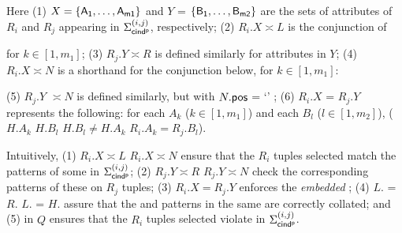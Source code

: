 \noindent Here (1) $X = \{\protect\mathsf{A_1,\dots, A_{m1}}\}$ and $Y$ =
$\{\protect\mathsf{B_1,\dots, B_{m2}}\}$ are the sets of attributes of $R_i$ and
 $R_j$ appearing in $\Sigma_{{\mathsf{cind^p}}}^{(i,j)}$, respectively;
(2) $R_i.X\asymp L$ is the conjunction of

\vspace{-1.5ex} \begin{footnotesize}\vspace{-1.5ex}
\end{footnotesize}

\noindent
for $k\in[1, m_1]$;
(3) $R_j.Y\asymp R$ is defined similarly for attributes
 in $Y$;
(4) $R_i.X\asymp N$ is a shorthand for the conjunction below,
for $k\in[1, m_1]$:

\vspace{-1.5ex} \begin{footnotesize}\vspace{-1.5ex}
\end{footnotesize}

\noindent
(5) $R_j.Y$ $\asymp N$ is defined similarly,
but with $N.\protect\mathsf{pos}$ = `\RHS' ; (6) $R_i.X$
  = $R_j.Y$ represents the following:
for each $A_k$  ($k\in[1, m_1]$) and each $B_l$ ($l\in[1, m_2]$),
($H.A_k$ 
 $H.B_l$   $H.B_l \ne H.A_k$   $R_i.A_k
= R_j.B_l$).



Intuitively, (1) $R_i.X\asymp L$  $R_i.X\asymp N$ ensure
that the $R_i$ tuples selected match the \LHS patterns of some
\pCINDs in  $\Sigma_{{\mathsf{cind^p}}}^{(i,j)}$;
(2) $R_j.Y\asymp R$  $R_j.Y\asymp N$ check the corresponding
 \RHS patterns of these \pCINDs on
$R_j$ tuples;
(3) $R_i.X = R_j.Y$ enforces the
{\em embedded} \INDs; (4) $L$. = $R$.
 $L$. = $H$. assure that the \LHS and
\RHS patterns in the same \pCIND are correctly collated; and (5)  in $Q$ ensures that the $R_i$ tuples selected violate
\pCINDs in $\Sigma_{{\mathsf{cind^p}}}^{(i,j)}$.


